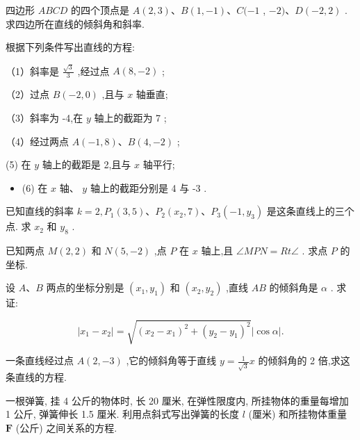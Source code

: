 \documentclass[lang=cn,newtx,10pt,scheme=chinese]{elegantbook}
\begin{document}
\begin{problemset}[习 题 二]

\item 四边形 \({ABCD}\) 的四个顶点是 \(A\left( {2,3}\right) \text{、}B\left( {1, - 1}\right) \text{、}C( - 1\) , \(- 2)\text{、}D\left( {-2,2}\right)\) . 求四边所在直线的倾斜角和斜率.

\item 根据下列条件写出直线的方程:

（1）斜率是 \(\frac{\sqrt{3}}{3}\) ,经过点 \(A\left( {8, - 2}\right)\) ;

（2）过点 \(B\left( {-2,0}\right)\) ,且与 \(x\) 轴垂直;

（3）斜率为 -4,在 \(y\) 轴上的截距为 7 ;

（4）经过两点 \(A\left( {-1,8}\right) \text{、}B\left( {4, - 2}\right)\) ;

(5) 在 \(y\) 轴上的截距是 2,且与 \(x\) 轴平行;

\begin{itemize}
  \item (6) 在 \(x\) 轴、 \(y\) 轴上的截距分别是 4 与 -3 .
\end{itemize}

\item 已知直线的斜率 \(k = 2,{P}_{1}\left( {3,5}\right) \text{、}{P}_{2}\left( {{x}_{2},7}\right) \text{、}{P}_{3}\left( {-1,{y}_{3}}\right)\) 是这条直线上的三个点. 求 \({x}_{2}\) 和 \({y}_{8}\) .

\item 已知两点 \(M\left( {2,2}\right)\) 和 \(N\left( {5, - 2}\right)\) ,点 \(P\) 在 \(x\) 轴上,且 \(\angle {MPN} = {Rt}\angle\) . 求点 \(P\) 的坐标.

\item 设 \(A\text{、}B\) 两点的坐标分别是 \(\left( {{x}_{1},{y}_{1}}\right)\) 和 \(\left( {{x}_{2},{y}_{2}}\right)\) ,直线 \({AB}\) 的倾斜角是 \(\alpha\) . 求证:

\[
  \left| {{x}_{1} - {x}_{2}}\right| = \sqrt{{\left( {x}_{2} - {x}_{1}\right) }^{2} + {\left( {y}_{2} - {y}_{1}\right) }^{2}}\left| {\cos \alpha }\right| .
\]

\item 一条直线经过点 \(A\left( {2, - 3}\right)\) ,它的倾斜角等于直线 \(y = \frac{1}{\sqrt{3}}x\) 的倾斜角的 2 倍,求这条直线的方程.

\item 一根弹簧, 挂 4 公斤的物体时, 长 20 厘米, 在弹性限度内, 所挂物体的重量每增加 1 公斤, 弹簧伸长 1.5 厘米. 利用点斜式写出弹簧的长度 \(l\) (厘米) 和所挂物体重量 \(\mathbf{F}\) (公斤) 之间关系的方程.


\end{problemset}
\end{document}
